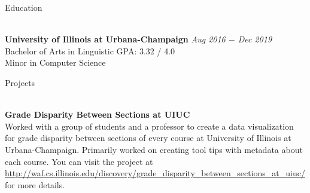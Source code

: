 \documentclass{resume}
\begin{document}
\begin{rSection}{Education}

\\{\bf University of Illinois at Urbana-Champaign} \hfill {\em Aug 2016 $-$ Dec 2019} 
\\ Bachelor of Arts in Linguistic\hfill { GPA: 3.32 / 4.0 }
\\ Minor in Computer Science
\end{rSection}

\begin{rSection}{Projects}

\\{\bf Grade Disparity Between Sections at UIUC} \\
Worked with a group of students and a professor to create a data visualization for grade disparity between sections of every course at University of Illinois at Urbana-Champaign. Primarily worked on creating tool tips with metadata about each course. You can visit the project at \url{http://waf.cs.illinois.edu/discovery/grade_disparity_between_sections_at_uiuc/} for more details.

\end{rSection}
\end{document}
